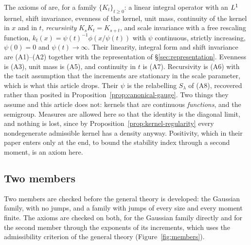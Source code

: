 \begin{remark}\label{rem:provenance-pauwels}
The axioms of  are, for a family $\{K_t\}_{t \ge 0}$: a linear
integral operator with an $L^1$ kernel, shift invariance, evenness of the kernel, unit mass,
continuity of the kernel in $x$ and in $t$, \emph{recursivity} $K_sK_t = K_{s+t}$, and scale
invariance with a free rescaling function, $k_t(x) = \psi(t)^{-1}\phi(x/\psi(t))$ with $\psi$
continuous, strictly increasing, $\psi(0) = 0$ and $\psi(t) \to \infty$. Their linearity,
integral form and shift invariance are (A1)--(A2) together with the representation of
\S\ref{sec:representation}. Evenness is (A3), unit mass is (A5), and continuity in $t$ is
(A7). Recursivity is (A6) with the tacit assumption that the increments are stationary in
the scale parameter, which is what this article drops. Their $\psi$ is the relabelling $S_\lambda$ of (A8), recovered
rather than posited in Proposition~\ref{prop:canonical-gauge}. Two things they assume and
this article does not: kernels that are continuous \emph{functions}, and the semigroup.
Measures are allowed here so that the identity is the diagonal limit, and nothing is lost,
since by Proposition~\ref{prop:kernel-regularity} every nondegenerate admissible kernel has
a density anyway. Positivity, which in their paper enters only at the end, to bound the
stability index through a second moment, is an axiom here.
\end{remark}

\subsection{Two members}\label{sec:axioms-members}

Two members are checked before the general theory is developed: the Gaussian family,
with no jumps, and a family with jumps of every size and every moment finite. The axioms are
checked on both, for the Gaussian family directly and for the second member through the
exponents of its increments, which uses the admissibility criterion of the general theory
(Figure~\ref{fig:members}).

